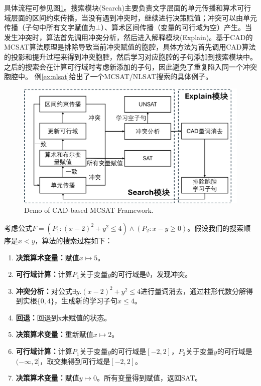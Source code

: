 具体流程可参见图\ref{fig:mcsat}。搜索模块(Search)主要负责文字层面的单元传播和算术可行域层面的区间约束传播，当没有遇到冲突时，继续进行决策赋值；冲突可以由单元传播（子句中所有文字赋值为$\bot$）、算术区间传播（变量的可行域为空）产生。当发生冲突时，算法首先调用冲突分析，然后进入解释模块(Explain)。基于CAD的MCSAT算法原理是排除导致当前冲突赋值的胞腔，具体方法为首先调用CAD算法的投影和提升过程来得到冲突胞腔，然后学习对应胞腔的子句添加到搜索模块中。之后的搜索会在计算可行域时考虑新添加的子句，因此避免了重复陷入同一个冲突胞腔中。
例\ref{ex:nlsat}给出了一个MCSAT/NLSAT搜索的具体例子。

\begin{figure}[t]
    \centering
    \includegraphics[width=0.6\columnwidth]{Img/mcsat.png}
     {Demo of CAD-based MCSAT Framework.}
    \label{fig:mcsat}
\end{figure}


\begin{example}
考虑公式$F=(P_1: (x-2)^2 + y^2 \le 4) \wedge (P_2: x - y \ge 0)$。假设我们的搜索顺序是$x < y$，算法的搜索过程如下：
\begin{enumerate}
    \item \textbf{决策算术变量：}赋值$x \mapsto 5$。
    \item \textbf{可行域计算：}计算$P_1$关于变量$y$的可行域是$\emptyset$，发现冲突。
    \item \textbf{冲突分析：}对公式$\exists y. (x-2)^2 + y^2 \le 4$进行量词消去，通过柱形代数分解得到实根$\{0, 4\}$，生成新的学习子句$x \le 4$。
    \item \textbf{回退：}回退到x未赋值的状态。
    \item \textbf{决策算术变量：}重新赋值$x \mapsto 2$。
    \item \textbf{可行域计算：}计算$P_1$关于变量$y$的可行域是$[-2, 2]$，$P_2$关于变量$y$的可行域是$(-\infty, 2]$，取交集得到可行域是$[-2, 2]$。
    \item \textbf{决策算术变量：}赋值$y \mapsto 0$。所有变量得到赋值，返回SAT。
\end{enumerate}
\label{ex:nlsat}
\end{example}

